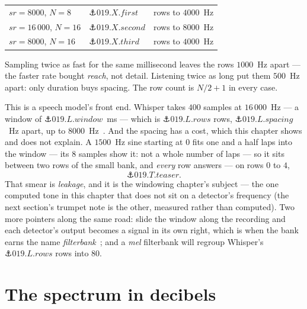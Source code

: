 \begin{narrative}
\begin{center}
\begin{tabular}{lll}
  $sr = 8000$, $N = 8$ & $\anchor{019.X.first}$ & rows to $4000$~Hz \\
  $sr = 16\,000$, $N = 16$ & $\anchor{019.X.second}$ & rows to $8000$~Hz \\
  $sr = 8000$, $N = 16$ & $\anchor{019.X.third}$ & rows to $4000$~Hz \\
\end{tabular}
\end{center}

\noindent Sampling twice as fast for the same millisecond leaves the
rows $1000$~Hz apart — the faster rate bought \emph{reach}, not detail.
Listening twice as long put them $500$~Hz apart: only duration buys
spacing. The row count is $N/2 + 1$ in every case.

This is a speech model's front end. Whisper takes $400$ samples at
$16\,000$~Hz — a window of $\anchor{019.L.window}$~ms — which is
$\anchor{019.L.rows}$ rows, $\anchor{019.L.spacing}$~Hz apart, up to
$8000$~Hz~\cite{signal_processing-radford-et-al-robust-speech-recognition-2022,signal_processing-openai-whisper-audio-py-at-8609812}.
And the spacing has a cost, which this chapter shows and does not
explain. A $1500$~Hz sine starting at $0$ fits one and a half laps into
the window — its $8$ samples show it: not a whole number of laps — so it
sits between two rows of the small bank, and \emph{every} row answers —
on rows $0$ to $4$,
\[
  \anchor{019.T.teaser} .
\]
That smear is
\emph{leakage}, and it is the windowing chapter's subject — the one
computed tone in this chapter that does not sit on a detector's
frequency (the next section's trumpet note is the other, measured
rather than computed). Two more
pointers along the same road: slide the window along the recording and
each detector's output becomes a signal in its own right, which is when
the bank earns the name
\emph{filterbank}~\cite{signal_processing-j-o-smith-spectral-audio-signal-processing-dft-filter-bank};
and a \emph{mel} filterbank will regroup Whisper's
$\anchor{019.L.rows}$ rows into $80$.

\section{The spectrum in decibels}


\end{narrative}
